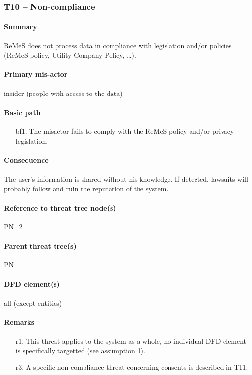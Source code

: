 \subsubsection{T10 -- Non-compliance}

\paragraph{Summary} ReMeS does not process data in compliance with legislation
and/or policies (ReMeS policy, Utility Company Policy, \ldots).

\paragraph{Primary mis-actor} insider (people with access to the data)

\paragraph{Basic path}
\begin{enumerate}
	\item[bf1.] The misactor fails to comply with the ReMeS policy and/or
	privacy legislation.
\end{enumerate}

\paragraph{Consequence} The user's information is shared without his knowledge.
If detected, lawsuits will probably follow and ruin the reputation of the
system.

\paragraph{Reference to threat tree node(s)} PN\_2

\paragraph{Parent threat tree(s)} PN

\paragraph{DFD element(s)} all (except entities)

\paragraph{Remarks}
\begin{enumerate}
     \item[r1.] This threat applies to the system as a whole, no individual DFD
     element is specifically targetted (see assumption 1).
	\item[r3.] A specific non-compliance threat concerning consents is
     described in T11.
\end{enumerate}